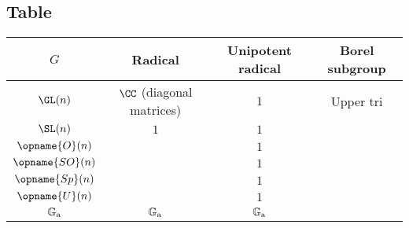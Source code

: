 \subsection{Table}
\begin{center}
  \begin{tabular}[h]{cccc}
    $G$ & Radical & Unipotent radical & Borel subgroup \\ \hline
    $\GL(n)$ & $\CC$ (diagonal matrices) & $1$ & Upper tri \\
    $\SL(n)$ & $1$ & $1$ \\
    $\opname{O}(n)$ & & $1$ \\
    $\opname{SO}(n)$ & & $1$ \\
    $\opname{Sp}(n)$ & & $1$ \\
    $\opname{U}(n)$ & & $1$ \\
    $\mathbb{G}_{\mathrm{a}}$ & $\mathbb{G}_{\mathrm{a}}$ & $\mathbb{G}_{\mathrm{a}}$ & \\
  \end{tabular}
\end{center}
